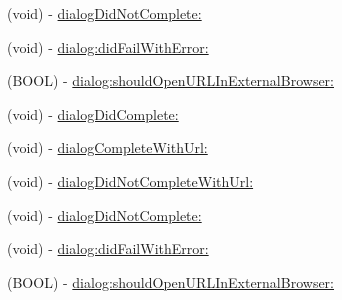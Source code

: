\begin{DoxyCompactItemize}
(void) -\/ \hyperlink{protocol_f_b_dialog_delegate-p_a1a9d02c6b2ea3cd0cd836daaa4a8c436}{dialog\-Did\-Not\-Complete\-:}
\item 
(void) -\/ \hyperlink{protocol_f_b_dialog_delegate-p_a72d2d07e22a7ecc75565bcfcbe4948ad}{dialog\-:did\-Fail\-With\-Error\-:}
\item 
(\-B\-O\-O\-L) -\/ \hyperlink{protocol_f_b_dialog_delegate-p_a78ae11dc38f12fb05c0d9658c76825d1}{dialog\-:should\-Open\-U\-R\-L\-In\-External\-Browser\-:}
\item 
(void) -\/ \hyperlink{protocol_f_b_dialog_delegate-p_a90dbc90d847c73d4b7c46851dad27088}{dialog\-Did\-Complete\-:}
\item 
(void) -\/ \hyperlink{protocol_f_b_dialog_delegate-p_a59efe809bb196af4b1888651c396e786}{dialog\-Complete\-With\-Url\-:}
\item 
(void) -\/ \hyperlink{protocol_f_b_dialog_delegate-p_a87a756757aef6af9bc35dafcab6cd259}{dialog\-Did\-Not\-Complete\-With\-Url\-:}
\item 
(void) -\/ \hyperlink{protocol_f_b_dialog_delegate-p_a1a9d02c6b2ea3cd0cd836daaa4a8c436}{dialog\-Did\-Not\-Complete\-:}
\item 
(void) -\/ \hyperlink{protocol_f_b_dialog_delegate-p_a72d2d07e22a7ecc75565bcfcbe4948ad}{dialog\-:did\-Fail\-With\-Error\-:}
\item 
(\-B\-O\-O\-L) -\/ \hyperlink{protocol_f_b_dialog_delegate-p_a78ae11dc38f12fb05c0d9658c76825d1}{dialog\-:should\-Open\-U\-R\-L\-In\-External\-Browser\-:}
\end{DoxyCompactItemize}


